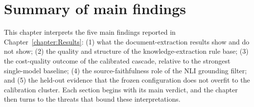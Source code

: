\section{Summary of main findings}\label{section:disc-summary-of-findings}

This chapter interprets the five main findings reported in Chapter~\ref{chapter:Results}: (1) what the document-extraction results show and do not show; (2) the quality and structure of the knowledge-extraction rule base; (3) the cost-quality outcome of the calibrated cascade, relative to the strongest single-model baseline; (4) the source-faithfulness role of the NLI grounding filter; and (5) the held-out evidence that the frozen configuration does not overfit to the calibration cluster. Each section begins with its main verdict, and the chapter then turns to the threats that bound these interpretations.

